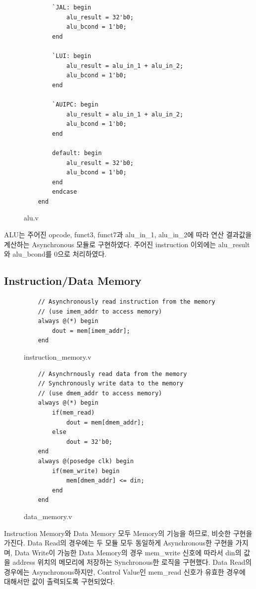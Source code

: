 \documentclass[openright, a4paper]{article}
\begin{document}
\begin{figure}[!h]
    \begin{verbatim}
        `JAL: begin
            alu_result = 32'b0;
            alu_bcond = 1'b0;
        end

        `LUI: begin
            alu_result = alu_in_1 + alu_in_2;
            alu_bcond = 1'b0;
        end

        `AUIPC: begin
            alu_result = alu_in_1 + alu_in_2;
            alu_bcond = 1'b0;
        end

        default: begin
            alu_result = 32'b0;
            alu_bcond = 1'b0;
        end
        endcase
    end
    \end{verbatim}
    \caption{alu.v}
\end{figure}

ALU는 주어진 opcode, funct3, funct7과 alu_in_1, alu_in_2에 따라 연산 결과값을 계산하는 Asynchronous 모듈로 구현하였다. 주어진 instruction 이외에는 alu_result와 alu_bcond를 0으로 처리하였다.

\subsection{Instruction/Data Memory}

\begin{figure}[!h]
    \begin{verbatim}
    // Asynchronously read instruction from the memory 
    // (use imem_addr to access memory)
    always @(*) begin
        dout = mem[imem_addr];
    end
    \end{verbatim}
    \caption{instruction_memory.v}
\end{figure}

\hfill \break
\begin{figure}[!h]
    \begin{verbatim}
    // Asynchrnously read data from the memory
    // Synchronously write data to the memory
    // (use dmem_addr to access memory)
    always @(*) begin
        if(mem_read)
            dout = mem[dmem_addr];
        else
            dout = 32'b0;
    end
    always @(posedge clk) begin
        if(mem_write) begin
            mem[dmem_addr] <= din;
        end
    end
    \end{verbatim}
    \caption{data_memory.v}
\end{figure}

Instruction Memory와 Data Memory 모두 Memory의 기능을 하므로, 비슷한 구현을 가진다. Data Read의 경우에는 두 모듈 모두 동일하게 Asynchronous한 구현을 가지며, Data Write이 가능한 Data Memory의 경우 mem_write 신호에 따라서 din의 값을 address 위치의 메모리에 저장하는 Synchronous한 로직을 구현했다. Data Read의 경우에는 Asynchronous하지만, Control Value인 mem_read 신호가 유효한 경우에 대해서만 값이 출력되도록 구현되었다.
\end{document}
